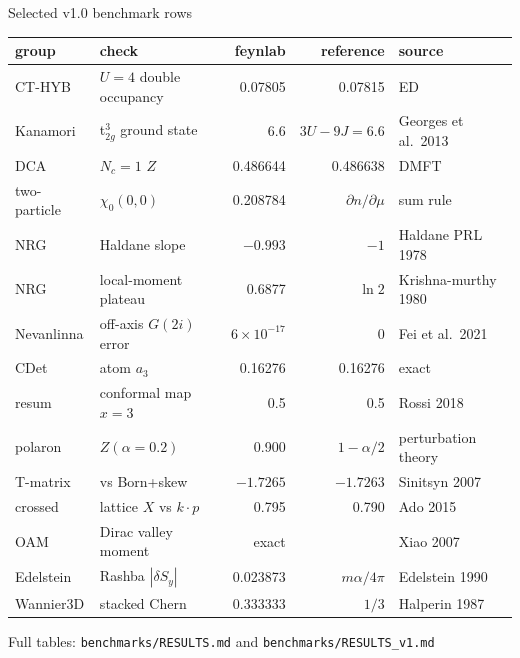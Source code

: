 \documentclass[aspectratio=169,10pt]{beamer}
\begin{document}
\begin{frame}{Selected v1.0 benchmark rows}
\scriptsize
\renewcommand{\arraystretch}{1.1}
\begin{tabular}{llrrl}
\toprule
group & check & feynlab & reference & source\\\midrule
CT-HYB & $U=4$ double occupancy & 0.07805 & 0.07815 & ED\\
Kanamori & t$_{2g}^3$ ground state & 6.6 & $3U-9J=6.6$ & Georges et al.\ 2013\\
DCA & $N_c=1$ $Z$ & 0.486644 & 0.486638 & DMFT\\
two-particle & $\chi_0(0,0)$ & 0.208784 & $\partial n/\partial\mu$ & sum rule\\
NRG & Haldane slope & $-0.993$ & $-1$ & Haldane PRL 1978\\
NRG & local-moment plateau & 0.6877 & $\ln2$ & Krishna-murthy 1980\\
Nevanlinna & off-axis $G(2i)$ error & $6\times10^{-17}$ & 0 & Fei et al.\ 2021\\
CDet & atom $a_3$ & 0.16276 & 0.16276 & exact\\
resum & conformal map $x=3$ & 0.5 & 0.5 & Rossi 2018\\
polaron & $Z(\alpha=0.2)$ & 0.900 & $1-\alpha/2$ & perturbation theory\\
T-matrix & vs Born+skew & $-1.7265$ & $-1.7263$ & Sinitsyn 2007\\
crossed & lattice $X$ vs $k\!\cdot\!p$ & 0.795 & 0.790 & Ado 2015\\
OAM & Dirac valley moment & exact & & Xiao 2007\\
Edelstein & Rashba $|\delta S_y|$ & 0.023873 & $m\alpha/4\pi$ & Edelstein 1990\\
Wannier3D & stacked Chern & 0.333333 & $1/3$ & Halperin 1987\\
\bottomrule
\end{tabular}
\vspace{0.1cm}

{\scriptsize Full tables: \texttt{benchmarks/RESULTS.md} and \texttt{benchmarks/RESULTS\_v1.md}}
\end{frame}
\end{document}
